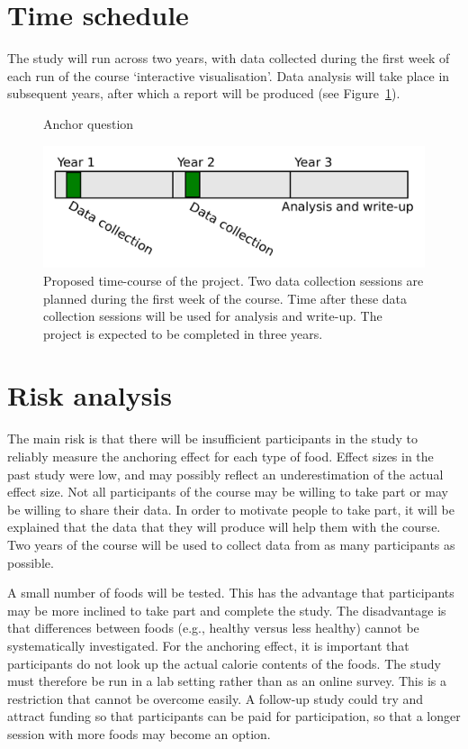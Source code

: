 \documentclass[a4paper,doc,natbib]{apa6}
\begin{document}
\section{Time schedule}

The study will run across two years, with data collected during the first week of each run of the course `interactive visualisation'. Data analysis will take place in subsequent years, after which a report will be produced (see Figure~\ref{fig:time_course}).

\begin{figure}[h!]
 \caption{Anchor question}
\includegraphics[width=0.95\linewidth]{Images/time_course.pdf}
 \caption{Proposed time-course of the project. Two data collection sessions are planned during the first week of the course. Time after these data collection sessions will be used for analysis and write-up. The project is expected to be completed in three years.}
\label{fig:time_course}
\end{figure}

\section{Risk analysis}

The main risk is that there will be insufficient participants in the study to reliably measure the anchoring effect for each type of food. Effect sizes in the past study \citep{shanks2020incidental} were low, and may possibly reflect an underestimation of the actual effect size. Not all participants of the course may be willing to take part or may be willing to share their data. In order to motivate people to take part, it will be explained that the data that they will produce will help them with the course. Two years of the course will be used to collect data from as many participants as possible.

A small number of foods will be tested. This has the advantage that participants may be more inclined to take part and complete the study. The disadvantage is that differences between foods (e.g., healthy versus less healthy) cannot be systematically investigated. For the anchoring effect, it is important that participants do not look up the actual calorie contents of the foods. The study must therefore be run in a lab setting rather than as an online survey. This is a restriction that cannot be overcome easily. A follow-up study could try and attract funding so that participants can be paid for participation, so that a longer session with more foods may become an option.
\end{document}

